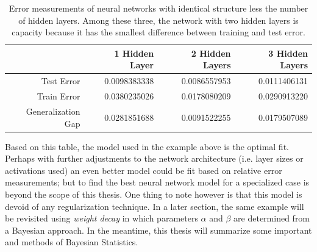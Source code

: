 \begin{table}[H]
\centering
\begin{tabular}{rrrr}
  \hline
 & 1 Hidden Layer & 2 Hidden Layers & 3 Hidden Layers \\ 
  \hline
Test Error & 0.0098383338 & 0.0086557953 & 0.0111406131 \\ 
Train Error & 0.0380235026 & 0.0178080209 & 0.0290913220 \\ 
Generalization Gap & 0.0281851688 & 0.0091522255 & 0.0179507089 \\ 
   \hline
\end{tabular}
\caption{\footnotesize Error measurements of neural networks with identical structure less the number of hidden layers.  Among these three, the network with two hidden layers is capacity because it has the smallest difference between training and test error.}
\label{gengapt}
\end{table}

Based on this table, the model used in the example above is the optimal fit.  Perhaps with further adjustments to the network architecture (i.e. layer sizes or activations used) an even better model could be fit based on relative error measurements; but to find the best neural network model for a specialized case is beyond the scope of this thesis.  One thing to note however is that this model is devoid of any regularization technique.  In a later section, the same example will be revisited using \textit{weight decay} in which parameters $\alpha$ and $\beta$ are determined from a Bayesian approach.  In the meantime, this thesis will summarize some important and methods of Bayesian Statistics.


